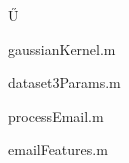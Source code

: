 \documentclass[10pt, a4paper]{article}
\begin{document}
Ű

\newpage
%

gaussianKernel.m


dataset3Params.m


processEmail.m


emailFeatures.m

\end{document}
